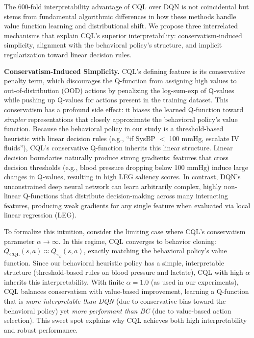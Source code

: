 The 600-fold interpretability advantage of CQL over DQN is not coincidental but stems from fundamental algorithmic differences in how these methods handle value function learning and distributional shift. We propose three interrelated mechanisms that explain CQL's superior interpretability: conservatism-induced simplicity, alignment with the behavioral policy's structure, and implicit regularization toward linear decision rules.

\textbf{Conservatism-Induced Simplicity.} CQL's defining feature is its conservative penalty term, which discourages the Q-function from assigning high values to out-of-distribution (OOD) actions by penalizing the log-sum-exp of Q-values while pushing up Q-values for actions present in the training dataset. This conservatism has a profound side effect: it biases the learned Q-function toward \textit{simpler} representations that closely approximate the behavioral policy's value function. Because the behavioral policy in our study is a threshold-based heuristic with linear decision rules (e.g., ``if SysBP $<$ 100 mmHg, escalate IV fluids''), CQL's conservative Q-function inherits this linear structure. Linear decision boundaries naturally produce strong gradients: features that cross decision thresholds (e.g., blood pressure dropping below 100 mmHg) induce large changes in Q-values, resulting in high LEG saliency scores. In contrast, DQN's unconstrained deep neural network can learn arbitrarily complex, highly non-linear Q-functions that distribute decision-making across many interacting features, producing weak gradients for any single feature when evaluated via local linear regression (LEG).

To formalize this intuition, consider the limiting case where CQL's conservatism parameter $\alpha \to \infty$. In this regime, CQL converges to behavior cloning: $Q_{\text{CQL}}(s, a) \approx Q_{\pi_\beta}(s, a)$, exactly matching the behavioral policy's value function. Since our behavioral heuristic policy has a simple, interpretable structure (threshold-based rules on blood pressure and lactate), CQL with high $\alpha$ inherits this interpretability. With finite $\alpha = 1.0$ (as used in our experiments), CQL balances conservatism with value-based improvement, learning a Q-function that is \textit{more interpretable than DQN} (due to conservative bias toward the behavioral policy) yet \textit{more performant than BC} (due to value-based action selection). This sweet spot explains why CQL achieves both high interpretability and robust performance.

